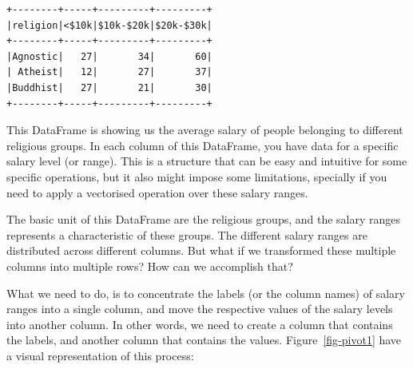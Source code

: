 \documentclass[
  11pt,
  letterpaper,
  DIV=11,
  numbers=noendperiod]{scrreprt}
\newenvironment{Shaded}{\begin{snugshade}}{\end{snugshade}}
\newcommand{\DecValTok}[1]{\textcolor[rgb]{0.68,0.00,0.00}{#1}}
\newcommand{\NormalTok}[1]{\textcolor[rgb]{0.00,0.23,0.31}{#1}}
\newcommand{\OperatorTok}[1]{\textcolor[rgb]{0.37,0.37,0.37}{#1}}
\newcommand{\StringTok}[1]{\textcolor[rgb]{0.13,0.47,0.30}{#1}}
\begin{document}
\begin{Shaded}
\end{Shaded}

\begin{verbatim}
+--------+-----+---------+---------+
|religion|<$10k|$10k-$20k|$20k-$30k|
+--------+-----+---------+---------+
|Agnostic|   27|       34|       60|
| Atheist|   12|       27|       37|
|Buddhist|   27|       21|       30|
+--------+-----+---------+---------+
\end{verbatim}

This DataFrame is showing us the average salary of people belonging to
different religious groups. In each column of this DataFrame, you have
data for a specific salary level (or range). This is a structure that
can be easy and intuitive for some specific operations, but it also
might impose some limitations, specially if you need to apply a
vectorised operation over these salary ranges.

The basic unit of this DataFrame are the religious groups, and the
salary ranges represents a characteristic of these groups. The different
salary ranges are distributed across different columns. But what if we
transformed these multiple columns into multiple rows? How can we
accomplish that?

What we need to do, is to concentrate the labels (or the column names)
of salary ranges into a single column, and move the respective values of
the salary levels into another column. In other words, we need to create
a column that contains the labels, and another column that contains the
values. Figure~\ref{fig-pivot1} have a visual representation of this
process:
\end{document}

